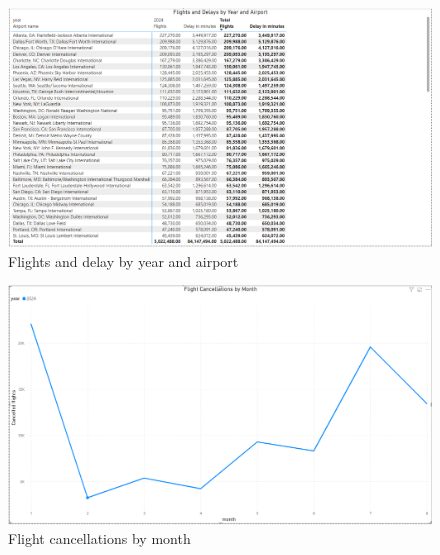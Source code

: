 \documentclass[12pt,a4paper]{article}
\begin{document}
\begin{figure}[H]
    \begin{center}
        \includegraphics[width=\textwidth]{Images/chart7.png}
        \newline
        \caption{Flights and delay by year and airport}
    \end{center}
\end{figure}
\begin{figure}[H]
    \begin{center}
        \includegraphics[width=\textwidth]{Images/chart8.png}
        \newline
        \caption{Flight cancellations by month}
    \end{center}
\end{figure}

\nocite{*}



\end{document}
